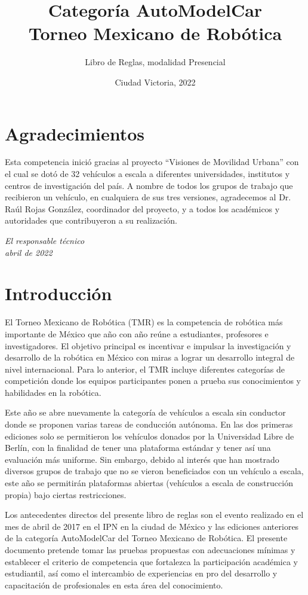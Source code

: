 \documentclass[letterpaper,12pt]{article}
\title{Categoría AutoModelCar\\Torneo Mexicano de Robótica}
\author{Libro de Reglas, modalidad Presencial}
\date{Ciudad Victoria, 2022}
\begin{document}
\maketitle

\section*{Agradecimientos}
Esta competencia inició gracias al proyecto “Visiones de Movilidad Urbana” con el cual se dotó de 32 vehículos a escala a diferentes universidades, institutos y centros de investigación del país. A nombre de todos los grupos de trabajo que recibieron un vehículo, en cualquiera de sus tres versiones, agradecemos al Dr. Raúl Rojas González, coordinador del proyecto, y a todos los académicos y autoridades que contribuyeron a su realización.  
 
\begin{flushright}
  \textit{
  El responsable técnico\\
  abril de 2022
  }
\end{flushright}

\section{Introducción}
El Torneo Mexicano de Robótica (TMR) es la competencia de robótica más importante de México que año con año reúne a estudiantes, profesores e investigadores. El objetivo principal es incentivar e impulsar la investigación y desarrollo de la robótica en México con miras a lograr un desarrollo integral de nivel internacional. Para lo anterior, el TMR incluye diferentes categorías de competición donde los equipos participantes ponen a prueba sus conocimientos y habilidades en la robótica.

Este año se abre nuevamente la categoría de vehículos a escala sin conductor donde se proponen varias tareas de conducción autónoma. En las dos primeras ediciones solo se permitieron los vehículos donados por la Universidad Libre de Berlín, con la finalidad de tener una plataforma estándar y tener así una evaluación más uniforme. Sin embargo, debido al interés que han mostrado diversos grupos de trabajo que no se vieron beneficiados con un vehículo a escala, este año se permitirán plataformas abiertas (vehículos a escala de construcción propia) bajo ciertas restricciones.

Los antecedentes directos del presente libro de reglas son el evento realizado en el mes de abril de 2017 en el IPN en la ciudad de México y las ediciones anteriores de la categoría AutoModelCar del Torneo Mexicano de Robótica. El presente documento pretende tomar las pruebas propuestas con adecuaciones mínimas y establecer el criterio de competencia que fortalezca la participación académica y estudiantil, así como el intercambio de experiencias en pro del desarrollo y capacitación de profesionales en esta área del conocimiento.
\end{document}
